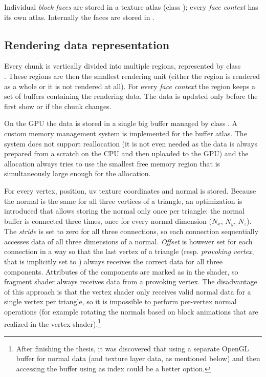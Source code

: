 Individual \textit{block faces} are stored in a texture atlas (class ); every \textit{face context} has its own atlas. Internally the faces are stored in .

\subsection{Rendering data representation}
Every chunk is vertically divided into multiple regions, represented by class \\. These regions are then the smallest rendering unit (either the region is rendered as a whole or it is not rendered at all). For every \textit{face context} the region keeps a set of buffers containing the rendering data. The data is updated only before the first show or if the chunk changes.

On the GPU the data is stored in a single big buffer managed by class . A custom memory management system is implemented for the buffer atlas. The system does not support reallocation (it is not even needed as the data is always prepared from a scratch on the CPU and then uploaded to the GPU) and the allocation always tries to use the smallest free memory region that is simultaneously large enough for the allocation.

For every vertex, position, uv texture coordinates and normal is stored. Because the normal is the same for all three vertices of a triangle, an optimization is introduced that allows storing the normal only once per triangle: the normal buffer is connected three times, once for every normal dimension ($N_x$, $N_y$, $N_z$). The \textit{stride} is set to zero for all three connections, so each connection sequentially accesses data of all three dimensions of a normal. \textit{Offset} is however set for each connection in a way so that the last vertex of a triangle (resp. \textit{provoking vertex}, that is implicitly set to ) always receives the correct data for all three components. Attributes of the components are marked as  in the shader, so fragment shader always receives data from a provoking vertex. The disadvantage of this approach is that the vertex shader only receives valid normal data for a single vertex per triangle, so it is impossible to perform per-vertex normal operations (for example rotating the normals based on block animations that are realized in the vertex shader).\footnote{After finishing the thesis, it was discovered that using a separate OpenGL buffer for normal data (and texture layer data, as mentioned below) and then accessing the buffer using  as index could be a better option.}


